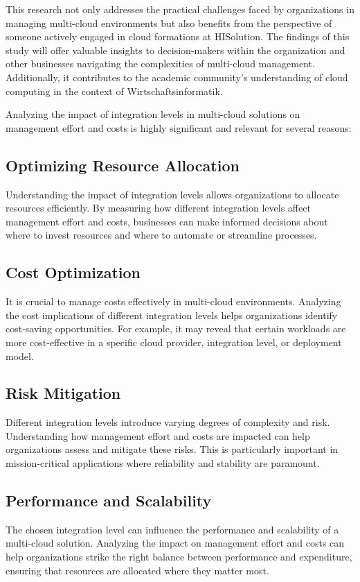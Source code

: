 This research not only addresses the practical challenges faced by organizations in managing multi-cloud environments 
but also benefits from the perspective of someone actively engaged in cloud formations at HISolution. 
The findings of this study will offer valuable insights to decision-makers within the organization 
and other businesses navigating the complexities of multi-cloud management. 
Additionally, it contributes to the academic community's understanding of cloud computing in the context of Wirtschaftsinformatik.

Analyzing the impact of integration levels in multi-cloud solutions on management effort and costs is highly significant and relevant for several reasons:

\subsection*{Optimizing Resource Allocation}
Understanding the impact of integration levels allows organizations to allocate resources efficiently. 
By measuring how different integration levels affect management effort and costs, 
businesses can make informed decisions about where to invest resources and where to automate or streamline processes.

\subsection*{Cost Optimization}
It is crucial to manage costs effectively in multi-cloud environments.
Analyzing the cost implications of different integration levels helps organizations identify cost-saving opportunities. 
For example, it may reveal that certain workloads are more cost-effective in a specific cloud provider, integration level, or deployment model.

\subsection*{Risk Mitigation}
Different integration levels introduce varying degrees of complexity and risk. 
Understanding how management effort and costs are impacted can help organizations assess and mitigate these risks. 
This is particularly important in mission-critical applications where reliability and stability are paramount.

\subsection*{Performance and Scalability}
The chosen integration level can influence the performance and scalability of a multi-cloud solution. 
Analyzing the impact on management effort and costs can help organizations strike the right balance between performance and expenditure, 
ensuring that resources are allocated where they matter most.

